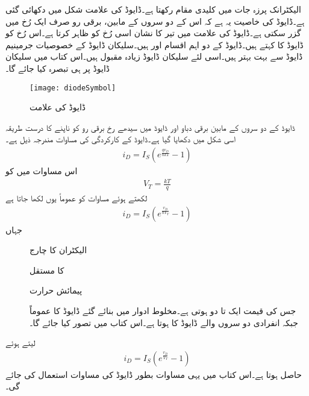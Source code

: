 
الیکٹرانک پرزہ جات میں   کلیدی مقام رکھتا ہے۔ڈایوڈ کی علامت شکل   میں دکھائی گئی ہے۔ڈایوڈ کی خاصیت یہ ہے کہ اس کے دو سروں کے مابین، برقی رو صرف ایک رُخ میں گزر سکتی ہے۔ڈایوڈ  کی علامت میں تیر کا نشان اسی رُخ کو ظاہر کرتا ہے۔اس رُخ کو ڈایوڈ کا   کہتے ہیں۔ڈایوڈ کے دو اہم اقسام  اور  ہیں۔سلیکان ڈایوڈ کے خصوصیات جرمینیم ڈایوڈ سے بہت بہتر ہیں۔اسی لئے سلیکان ڈایوڈ زیادہ مقبول ہیں۔اس کتاب میں سلیکان ڈایوڈ پر ہی تبصرہ کیا جائے گا۔  
\begin{figure}
\centering
\texttt{[image: diodeSymbol]}
\caption{ڈایوڈ کی علامت}
\label{شکل_ڈایوڈ_کی_علامت}
\end{figure}
ڈایوڈ کے دو سروں کے مابین برقی دباو   اور ڈایوڈ  میں سیدھے رخ  برقی رو  کو ناپنے کا درست طریقہ اسی شکل میں دکھایا گیا ہے۔ڈایوڈ کے کارکردگی کی  مساوات مندرجہ ذیل ہے۔
\begin{align}
i_D=I_S \left (e^{\frac{q v_D}{n k T}}-1 \right )
\end{align}
اس مساوات میں   کو
\begin{align}
V_T=\frac{k T}{q}
\end{align}
لکھتے ہوئے مساوات کو عموماً یوں لکھا جاتا ہے
\begin{align} \label{مساوات_ڈایوڈ_کی_مکمل_مساوات}
i_D=I_S \left (e^{\frac{v_D}{n V_T}}-1 \right )
\end{align}
جہاں
\begin{description}
\item
[]  
\item
[]  الیکٹران کا چارج 
\item
[]   کا مستقل
\item
[]   پیمائش حرارت
\item
[] 
\item
[]   جس کی قیمت ایک تا دو ہوتی ہے۔مخلوط ادوار میں بنائے گئے ڈایوڈ کا عموماً  جبکہ انفرادی دو سروں والے ڈایوڈ کا  ہوتا ہے۔اس کتاب میں  تصور کیا جائے گا۔ 

\end{description}
 لیتے ہوئے
\begin{align} \label{مساوات_ڈایوڈ_کی_مساوات}
i_D=I_S \left (e^{\frac{v_D}{V_T}}-1 \right )
\end{align}
حاصل ہوتا ہے۔اس کتاب میں یہی مساوات بطور ڈایوڈ کی مساوات استعمال کی جائے گی۔

